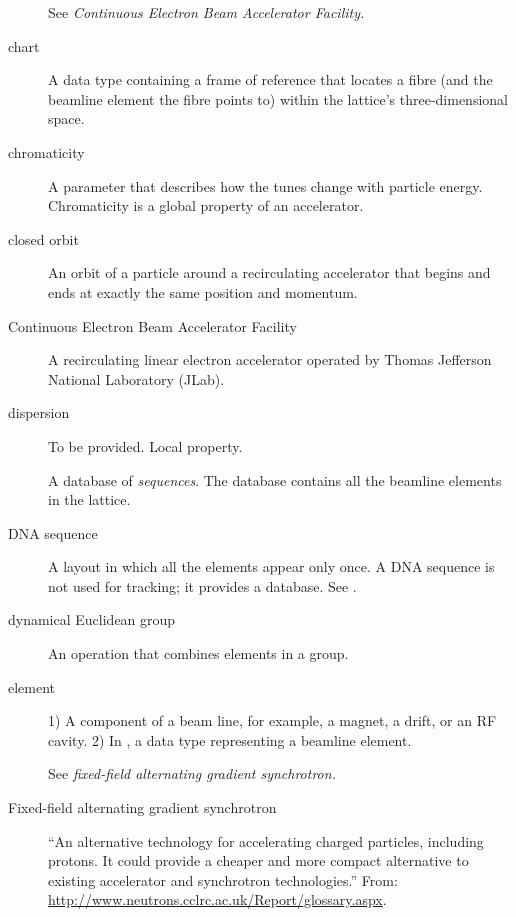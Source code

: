 \begin{description}
  \item[{}]
See \emph{Continuous Electron Beam Accelerator Facility.}

  \item[chart]
A data type containing a frame of reference that locates a fibre (and the beamline element
the fibre points to) within the lattice's three-dimensional space.

  \item[chromaticity]
A parameter that describes how the tunes change with particle energy. Chromaticity
is a global property of an accelerator.

  \item[closed orbit]
An orbit of a particle around a recirculating accelerator that begins
and ends at exactly the same position and momentum.

  \item[Continuous Electron Beam Accelerator Facility]
A recirculating linear electron accelerator operated by Thomas Jefferson
National Laboratory (JLab).

  \item[dispersion]
To be provided. Local property.

  \item[{}]
A database of \emph{ sequences}.
The database contains all the beamline elements in the lattice.

  \item[DNA sequence]
A layout in which all the elements appear only once. A DNA sequence
is not used for tracking; it provides a database.
See .

  \item[dynamical Euclidean group]
An operation that combines elements in a group.

  \item[element]
1) A component of a beam line, for example, a magnet, a drift, or
an RF cavity. 2) In \PTC, a data type representing a beamline
element.

  \item[{}]
See \emph{fixed-field alternating gradient synchrotron.}

  \item[Fixed-field alternating gradient synchrotron]
``An alternative technology for accelerating charged particles,
including protons. It could provide a cheaper and more compact alternative
to existing accelerator and synchrotron technologies.''
From: \url{http://www.neutrons.cclrc.ac.uk/Report/glossary.aspx}.


\end{description}
